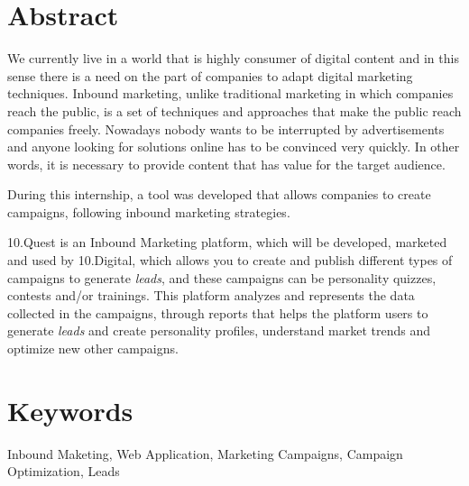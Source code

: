 \section*{Abstract}
\label{sec:abstract}


We currently live in a world that is highly consumer of digital content and in this sense there is a need on the part of companies to adapt digital marketing techniques. Inbound marketing, unlike traditional marketing in which companies reach the public, is a set of techniques and approaches that make the public reach companies freely. Nowadays nobody wants to be interrupted by advertisements and anyone looking for solutions online has to be convinced very quickly. In other words, it is necessary to provide content that has value for the target audience.

During this internship, a tool was developed that allows companies to create campaigns, following inbound marketing strategies.

10.Quest is an Inbound Marketing platform, which will be developed, marketed and used by 10.Digital, which allows you to create and publish different types of campaigns to generate  \textit {leads}, and these campaigns can be personality quizzes, contests and/or trainings. This platform analyzes and represents the data collected in the campaigns, through reports that helps the platform users to generate \textit {leads} and create personality profiles, understand market trends and optimize new other campaigns.



\section*{Keywords}
\label{sec:keywords}

Inbound Maketing, Web Application, Marketing Campaigns, Campaign Optimization, Leads 
